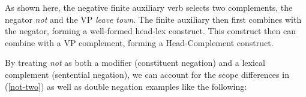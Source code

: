 \documentclass[output=paper]{langsci/langscibook}
\begin{document}
\be
\ex {}
\ee


\medskip
\noindent As shown here, the negative finite auxiliary verb
 selects two complements, the negator \emph{not} and the
VP \emph{leave town}. The finite auxiliary then first combines with
the negator, forming a well-formed head-lex construct. This construct
then can combine with a VP complement, forming a Head-Complement
construct.

By treating \emph{not} as both a modifier (constituent negation)
and a lexical complement (sentential negation), we can
account for
the scope differences in (\ref{not-two}) as well as double
negation examples like the following:

\be
\ex \begin{xlist}

\end{xlist}
\ee
%
\end{document}
